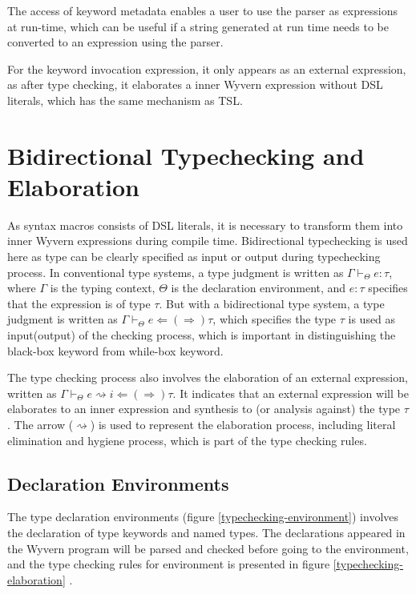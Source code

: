 \documentclass{sig-alternate}
\begin{document}
The access of keyword metadata enables a user to use the parser as expressions at run-time, which can be useful if a string generated at run time needs to be converted to an expression using the parser.

For the keyword invocation expression, it only appears as an external expression, as after type checking, it elaborates a inner Wyvern expression without DSL literals, which has the same mechanism as TSL. 


\section{Bidirectional Typechecking and Elaboration}
As syntax macros consists of DSL literals, it is necessary to transform them into inner Wyvern expressions during compile time. Bidirectional typechecking is used here as type can be clearly specified as input or output during typechecking process. In conventional type systems, a type judgment is written as $\Gamma\vdash_{\Theta} e:\tau$, where $\Gamma$ is the typing context, $\Theta$ is the declaration environment, and $e:\tau$ specifies that the expression is of type $\tau$. But with a bidirectional type system, a type judgment is written as $\Gamma\vdash_{\Theta} e\Leftarrow(\Rightarrow)\tau$, which specifies the type $\tau$ is used as input(output) of the checking process, which is important in distinguishing the black-box keyword from while-box keyword.
\par
The type checking process also involves the elaboration of an external expression, written as $\Gamma\vdash_{\Theta} e\rightsquigarrow i \Leftarrow(\Rightarrow) \tau$. It indicates that an external expression will be elaborates to an inner expression and synthesis to (or analysis against) the type $\tau$. The arrow ($\rightsquigarrow$) is used to represent the elaboration process, including literal elimination and hygiene process, which is part of the type checking rules.

\subsection{Declaration Environments}
The type declaration environments (figure \ref{typechecking-environment}) involves the declaration of type keywords and named types. The declarations appeared in the Wyvern program will be parsed and checked before going to the environment, and the type checking rules for environment is presented in figure \ref{typechecking-elaboration} . 
\end{document}
